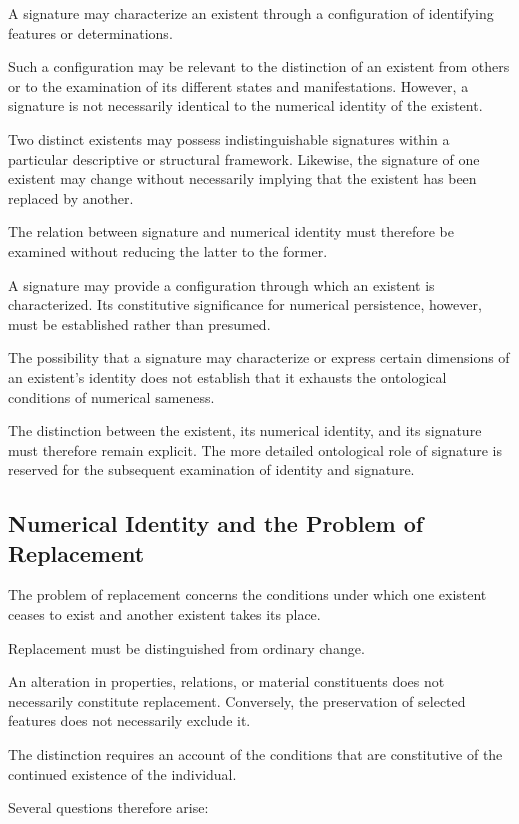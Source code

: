 A signature may characterize an existent
through a configuration of identifying
features or determinations.

Such a configuration may be relevant
to the distinction of an existent from
others or to the examination of its
different states and manifestations.
However, a signature is not necessarily
identical to the numerical identity
of the existent.

Two distinct existents may possess
indistinguishable signatures within
a particular descriptive or structural
framework. Likewise, the signature
of one existent may change without
necessarily implying that the existent
has been replaced by another.

The relation between signature and
numerical identity must therefore be
examined without reducing the latter
to the former.

A signature may provide a configuration
through which an existent is characterized.
Its constitutive significance for
numerical persistence, however, must
be established rather than presumed.

The possibility that a signature may
characterize or express certain dimensions
of an existent's identity does not
establish that it exhausts the ontological
conditions of numerical sameness.

The distinction between the existent,
its numerical identity, and its signature
must therefore remain explicit. The
more detailed ontological role of
signature is reserved for the subsequent
examination of identity and signature.

\subsection{Numerical Identity and the Problem of Replacement}

The problem of replacement concerns
the conditions under which one existent
ceases to exist and another existent
takes its place.

Replacement must be distinguished
from ordinary change.

An alteration in properties, relations,
or material constituents does not
necessarily constitute replacement.
Conversely, the preservation of selected
features does not necessarily exclude it.

The distinction requires an account
of the conditions that are constitutive
of the continued existence of the
individual.

Several questions therefore arise:

